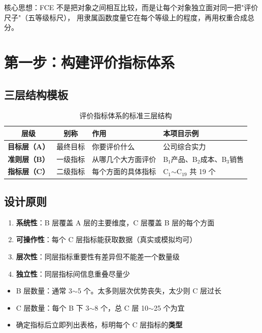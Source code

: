 \documentclass[a4paper,11pt]{ctexart}
\begin{document}
\begin{keybox}
核心思想：FCE 不是把对象之间相互比较，而是让每个对象独立面对同一把"评价尺子"（五等级标尺），
用隶属函数度量它在每个等级上的程度，再用权重合成总分。
\end{keybox}

\section{第一步：构建评价指标体系}

\subsection{三层结构模板}

\begin{table}[H]
\centering
\caption{评价指标体系的标准三层结构}
\begin{tabular}{ccll}
\toprule
\textbf{层级} & \textbf{别称} & \textbf{作用} & \textbf{本项目示例} \\
\midrule
\textbf{目标层（A）} & 最终目标 & 你要评价什么 & 公司综合实力 \\
\textbf{准则层（B）} & 一级指标 & 从哪几个大方面评价 & B$_1$产品、B$_2$成本、B$_3$销售 \\
\textbf{指标层（C）} & 二级指标 & 每个方面的具体指标 & C$_1$$\sim$C$_{19}$ 共 19 个 \\
\bottomrule
\end{tabular}
\end{table}

\subsection{设计原则}

\begin{enumerate}
    \item \textbf{系统性}：B 层覆盖 A 层的主要维度，C 层覆盖 B 层的每个方面
    \item \textbf{可操作性}：每个 C 层指标能获取数据（真实或模拟均可）
    \item \textbf{层次性}：同层指标重要性有差异但不能差一个数量级
    \item \textbf{独立性}：同层指标间信息重叠尽量少
\end{enumerate}

\begin{tipbox}
\begin{itemize}
    \item B 层数量：通常 3$\sim$5 个。太多则层次优势丧失，太少则 C 层过长
    \item C 层数量：每个 B 下 3$\sim$8 个，总 C 层 10$\sim$25 个为宜
    \item 确定指标后立即列出表格，标明每个 C 层指标的\textbf{类型}
\end{itemize}
\end{tipbox}
\end{document}
